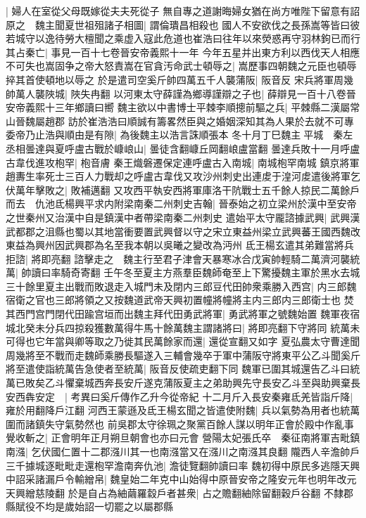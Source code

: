 |{
	婦人在室從父母既嫁從夫夫死從子}
無自專之道謝晦婦女猶在尚方唯陛下留意有詔原之　魏主聞夏世祖殂諸子相圖|{
	謂倫璝昌相殺也}
國人不安欲伐之長孫嵩等皆曰彼若城守以逸待勞大檀聞之乘虚入寇此危道也崔浩曰往年以來熒惑再守羽林鉤已而行其占秦亡|{
	事見一百十七卷晉安帝義熙十一年}
今年五星并出東方利以西伐天人相應不可失也嵩固争之帝大怒責嵩在官貪汚命武士頓辱之|{
	嵩歷事四朝魏之元臣也頓辱捽其首使頓地以辱之}
於是遣司空奚斤帥四萬五千人襲蒲阪|{
	阪音反}
宋兵將軍周幾帥萬人襲陜城|{
	陜失冉翻}
以河東太守薛謹為鄉導謹辯之子也|{
	薛辯見一百十八卷晉安帝義熙十三年鄉讀曰嚮}
魏主欲以中書博士平棘李順摠前驅之兵|{
	平棘縣二漢屬常山晉魏屬趙郡}
訪於崔浩浩曰順誠有籌畧然臣與之婚姻深知其為人果於去就不可專委帝乃止浩與順由是有隙|{
	為後魏主以浩言誅順張本}
冬十月丁巳魏主平城　秦左丞相曇達與夏呼盧古戰於嵻㟍山|{
	曇徒含翻嵻丘岡翻㟍盧當翻}
曇達兵敗十一月呼盧古韋伐進攻枹罕|{
	枹音膚}
秦王熾磐遷保定連呼盧古入南城|{
	南城枹罕南城}
鎮京將軍趙夀生率死士三百人力戰却之呼盧古韋伐又攻沙州刺史出連䖍于湟河䖍遣後將軍乞伏萬年擊敗之|{
	敗補邁翻}
又攻西平執安西將軍庫洛干阬戰士五千餘人掠民二萬餘戶而去　仇池氐楊興平求内附梁南秦二州刺史吉翰|{
	晉泰始之初立梁州於漢中至安帝之世秦州又治漢中自是鎮漢中者帶梁南秦二州刺史}
遣始平太守龎諮據武興|{
	武興漢武都郡之沮縣也蜀以其地當衝要置武興督以守之宋立東益州梁立武興蕃王國西魏改東益為興州因武興郡為名至我本朝以吳曦之變改為沔州}
氐王楊玄遣其弟難當將兵拒諮|{
	將即亮翻}
諮擊走之　魏主行至君子津會天暴寒冰合戊寅帥輕騎二萬濟河襲統萬|{
	帥讀曰率騎奇寄翻}
壬午冬至夏主方燕羣臣魏師奄至上下驚擾魏主軍於黑水去城三十餘里夏主出戰而敗退走入城門未及閉内三郎豆代田帥衆乘勝入西宫|{
	内三郎魏宿衛之官也三郎將領之又按魏道武帝天興初置幢將幢將主内三郎内三郎衛士也}
焚其西門宫門閉代田踰宫垣而出魏主拜代田勇武將軍|{
	勇武將軍之號魏始置}
魏軍夜宿城北癸未分兵四掠殺獲數萬得牛馬十餘萬魏主謂諸將曰|{
	將即亮翻下守將同}
統萬未可得也它年當與卿等取之乃徙其民萬餘家而還|{
	還從宣翻又如字}
夏弘農太守曹達聞周幾將至不戰而走魏師乘勝長驅遂入三輔會幾卒于軍中蒲阪守將東平公乙斗聞奚斤將至遣使詣統萬告急使者至統萬|{
	阪音反使疏吏翻下同}
魏軍已圍其城還告乙斗曰統萬已敗矣乙斗懼棄城西奔長安斤遂克蒲阪夏主之弟助興先守長安乙斗至與助興棄長安西犇安定　|{
	考異曰奚斤傳作乙升今從帝紀}
十二月斤入長安秦雍氐羌皆詣斤降|{
	雍於用翻降戶江翻}
河西王蒙遜及氐王楊玄聞之皆遣使附魏|{
	兵以氣勢為用者也統萬圍而諸鎮失守氣勢然也}
前吳郡太守徐珮之聚黨百餘人謀以明年正會於殿中作亂事覺收斬之|{
	正會明年正月朔旦朝會也亦曰元會}
營陽太妃張氏卒　秦征南將軍吉毗鎮南漒|{
	乞伏國仁置十二郡漒川其一也南漒當又在漒川之南漒其良翻}
隴西人辛澹帥戶三千據城逐毗毗走還枹罕澹南奔仇池|{
	澹徒覽翻帥讀曰率}
魏初得中原民多逃隱天興中詔采諸漏戶令輸繒帛|{
	魏皇始二年克中山始得中原晉安帝之隆安元年也明年改元天興繒慈陵翻}
於是自占為紬繭羅縠戶者甚衆|{
	占之贍翻紬除留翻穀戶谷翻}
不隸郡縣賦役不均是歲始詔一切罷之以屬郡縣

